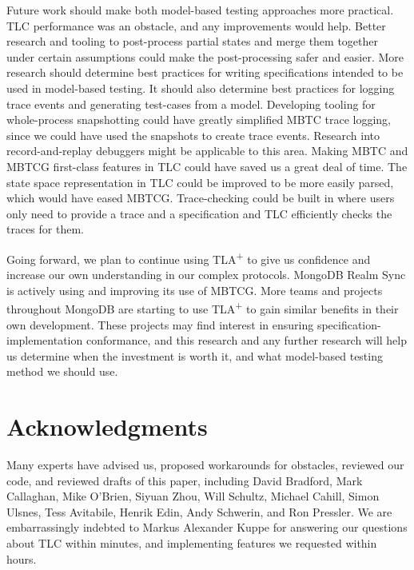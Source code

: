 \documentclass{vldb}
\begin{document}
Future work should make both model-based testing approaches more practical.
TLC performance was an obstacle, and any improvements would help.
Better research and tooling to post-process partial states and merge them together under certain assumptions could make the post-processing safer and easier.
More research should determine best practices for writing specifications intended to be used in model-based testing.
It should also determine best practices for logging trace events and generating test-cases from a model.
Developing tooling for whole-process snapshotting could have greatly simplified MBTC trace logging, since we could have used the snapshots to create trace events.
Research into record-and-replay debuggers \cite{OCallahan17RRDebugger} might be applicable to this area.
Making MBTC and MBTCG first-class features in TLC could have saved us a great deal of time.
The state space representation in TLC could be improved to be more easily parsed, which would have eased MBTCG.
Trace-checking could be built in where users only need to provide a trace and a specification and TLC efficiently checks the traces for them.

Going forward, we plan to continue using TLA\textsuperscript{+} to give us confidence and increase our own understanding in our complex protocols.
MongoDB Realm Sync is actively using and improving its use of MBTCG.
More teams and projects throughout MongoDB are starting to use TLA\textsuperscript{+} to gain similar benefits in their own development.
These projects may find interest in ensuring specification-implementation conformance, and this research and any further research will help us determine when the investment is worth it, and what model-based testing method we should use.


\section{Acknowledgments}
\label{sec:acknowledgments}
Many experts have advised us, proposed workarounds for obstacles, reviewed our code, and reviewed drafts of this paper, including 
David Bradford,
Mark Callaghan,
Mike O'Brien,
Siyuan Zhou,
Will Schultz,
Michael Cahill,
Simon Ulsnes,
Tess Avitabile,
Henrik Edin,
Andy Schwerin,
and Ron Pressler.
We are embarrassingly indebted to Markus Alexander Kuppe for answering our questions about TLC within minutes, and implementing features we requested within hours.


\end{document}
